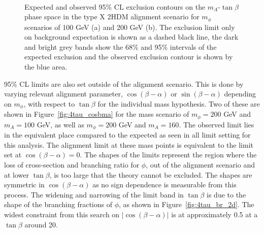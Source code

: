 \begin{figure}[!hbtp]
\centering
     \\
\caption[Plots of the model-dependent limits in the type X 2HDM alignment scenario.]{Expected and observed 95\% CL exclusion contours on the $m_{A}$-$\tan\beta$ phase space in the type X 2HDM alignment scenario for $m_{\phi}$ scenarios of 100 GeV (a) and 200 GeV (b). The exclusion limit only on background expectation is shown as a dashed black line, the dark and bright grey bands show the 68\% and 95\% intervals of the expected exclusion and the observed exclusion contour is shown by the blue area.}
\label{fig:4tau_md}
\end{figure}

95\% \ac{CL} limits are also set outside of the alignment scenario.
This is done by varying relevant alignment parameter, $\cos(\beta-\alpha)$ or $\sin(\beta-\alpha)$ depending on $m_\phi$, with respect to $\tan\beta$ for the individual mass hypothesis.
Two of these are shown in Figure~\ref{fig:4tau_cosbma} for the mass scenario of $m_{\phi} = 200$ GeV and $m_{A} = 100$ GeV, as well as $m_{\phi} = 200$ GeV and $m_{A} = 160$.
The observed limit lies in the equivalent place compared to the expected as seen in all limit setting for this analysis.
The alignment limit at these mass points is equivalent to the limit set at $\cos(\beta-\alpha) = 0$.
The shapes of the limits represent the region where the loss of cross-section and branching ratio for $\phi$, out of the alignment scenario and at lower $\tan\beta$, is too large that the theory cannot be excluded.
The shapes are symmetric in $\cos(\beta-\alpha)$ as no sign dependence is measurable from this process.
The widening and narrowing of the limit band in $\tan\beta$ is due to the shape of the branching fractions of $\phi$, as shown in Figure~\ref{fig:4tau_br_2d}.
The widest constraint from this search on $|\cos(\beta-\alpha)|$ is at approximately 0.5 at a $\tan\beta$ around 20.

